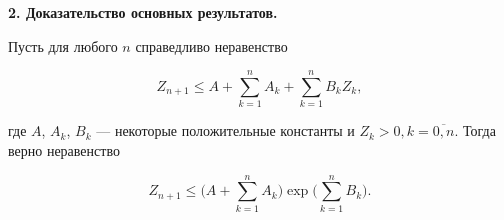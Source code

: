 {\bf 2. Доказательство основных результатов.}





\begin{lem}


Пусть для любого $n$ справедливо неравенство


\begin{equation}


Z_{n+1}\leq A+\sum_{k=1}^nA_k+\sum_{k=1}^nB_kZ_k,


\end{equation}


где $A$, $A_k$, $B_k$ --- некоторые положительные константы и $Z_k>0,


k=\overline{0,n}$. Тогда верно неравенство


$$


Z_{n+1}\leq\bigg(A+\sum\limits_{k=1}^nA_k\bigg)\exp\bigg(


\sum\limits_{k=1}^nB_k \bigg).


$$


\end{lem}





